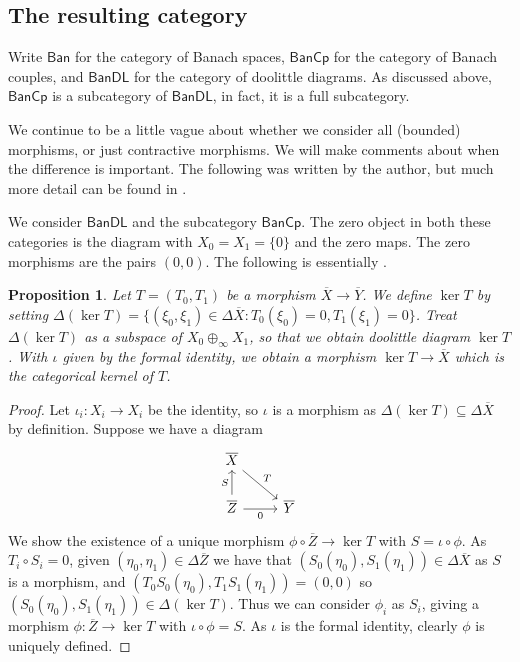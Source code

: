 \documentclass[a4paper,11pt]{article}
\theoremstyle{plain}
\newtheorem{proposition}{Proposition}[section]
\theoremstyle{remark}
\newcommand{\msf}[1]{\mathsf{#1}}
\begin{document}
\subsection{The resulting category}

Write $\msf{Ban}$ for the category of Banach spaces, $\msf{BanCp}$ for the category of Banach couples, and $\msf{BanDL}$ for the category of doolittle diagrams.  As discussed above, $\msf{BanCp}$ is a subcategory of $\msf{BanDL}$, in fact, it is a full subcategory.

We continue to be a little vague about whether we consider all (bounded) morphisms, or just contractive morphisms.  We will make comments about when the difference is important.  The following was written by the author, but much more detail can be found in \cite[Section~IV.3]{KP_InterpolationFunctorsDuality}.

We consider $\msf{BanDL}$ and the subcategory $\msf{BanCp}$.
The zero object in both these categories is the diagram with $X_0 = X_1 = \{0\}$ and the zero maps.  The zero morphisms are the pairs $(0,0)$.  The following is essentially \cite[Proposition~IV.3.2]{KP_InterpolationFunctorsDuality}.

\begin{proposition}\label{prop:kernel_DL}
Let $T=(T_0,T_1)$ be a morphism $\overline X \to \overline Y$.  We define $\ker T$ by setting $\Delta(\ker T) = \{ (\xi_0,\xi_1)\in\Delta\overline X : T_0(\xi_0)=0, T_1(\xi_1)=0 \}$.
Treat $\Delta(\ker T)$ as a subspace of $X_0\oplus_\infty X_1$, so that we obtain doolittle diagram $\ker T$.  With $\iota$ given by the formal identity, we obtain a morphism $\ker T \to \overline X$ which is the categorical kernel of $T$.
\end{proposition}
\begin{proof}
Let $\iota_i \colon X_i\to X_i$ be the identity, so $\iota$ is a morphism as $\Delta(\ker T) \subseteq \Delta\overline X$ by definition.
Suppose we have a diagram
\[ \begin{tikzcd}
  \overline X \arrow[rd, "T"] \\
  \overline Z \arrow[u, "S"] \arrow[r, "0"'] & \overline Y
\end{tikzcd} \]
We show the existence of a unique morphism $\phi\circ \overline Z \to \ker T$ with $S = \iota\circ \phi$.  As $T_i\circ S_i = 0$, given $(\eta_0,\eta_1) \in \Delta\overline Z$ we have that $(S_0(\eta_0), S_1(\eta_1)) \in \Delta\overline X$ as $S$ is a morphism, and $(T_0S_0(\eta_0), T_1S_1(\eta_1))= (0,0)$ so $(S_0(\eta_0), S_1(\eta_1)) \in \Delta(\ker T)$.  Thus we can consider $\phi_i$ as $S_i$, giving a morphism $\phi\colon\overline Z \to \ker T$ with $\iota\circ\phi=S$.  As $\iota$ is the formal identity, clearly $\phi$ is uniquely defined.
\end{proof}
\end{document}
